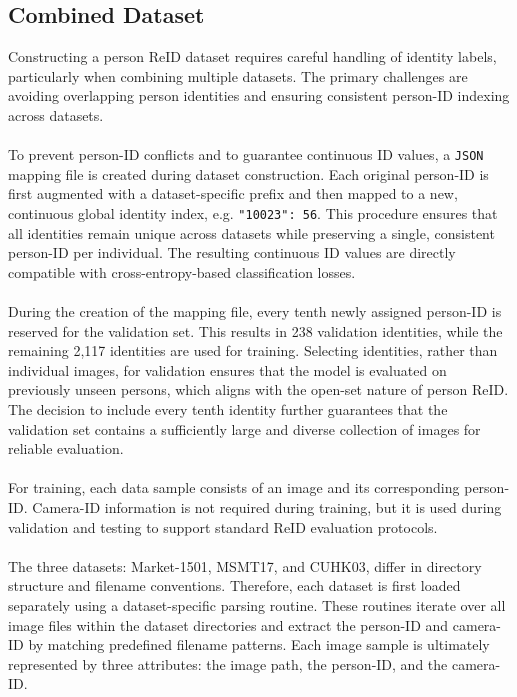 \subsection{Combined Dataset}\label{combineddataset}
Constructing a person \acs{ReID} dataset requires careful handling of identity labels, particularly when combining multiple datasets. The primary challenges are avoiding overlapping person identities and ensuring consistent person-ID indexing across datasets.
\\\\
To prevent person-ID conflicts and to guarantee continuous ID values, a \texttt{JSON} mapping file is created during dataset construction. Each original person-ID is first augmented with a dataset-specific prefix and then mapped to a new, continuous global identity index, e.g. \texttt{"10023": 56}. This procedure ensures that all identities remain unique across datasets while preserving a single, consistent person-ID per individual. The resulting continuous ID values are directly compatible with cross-entropy-based classification losses.
\\\\
During the creation of the mapping file, every tenth newly assigned person-ID is reserved for the validation set. This results in 238 validation identities, while the remaining 2,117 identities are used for training. Selecting identities, rather than individual images, for validation ensures that the model is evaluated on previously unseen persons, which aligns with the open-set nature of person \acs{ReID}. The decision to include every tenth identity further guarantees that the validation set contains a sufficiently large and diverse collection of images for reliable evaluation.
\\\\
For training, each data sample consists of an image and its corresponding person-ID. Camera-ID information is not required during training, but it is used during validation and testing to support standard \acs{ReID} evaluation protocols.
\\\\
The three datasets: Market-1501, \acs{MSMT17}, and \acs{CUHK03}, differ in directory structure and filename conventions. Therefore, each dataset is first loaded separately using a dataset-specific parsing routine. These routines iterate over all image files within the dataset directories and extract the person-ID and camera-ID by matching predefined filename patterns. Each image sample is ultimately represented by three attributes: the image path, the person-ID, and the camera-ID.
